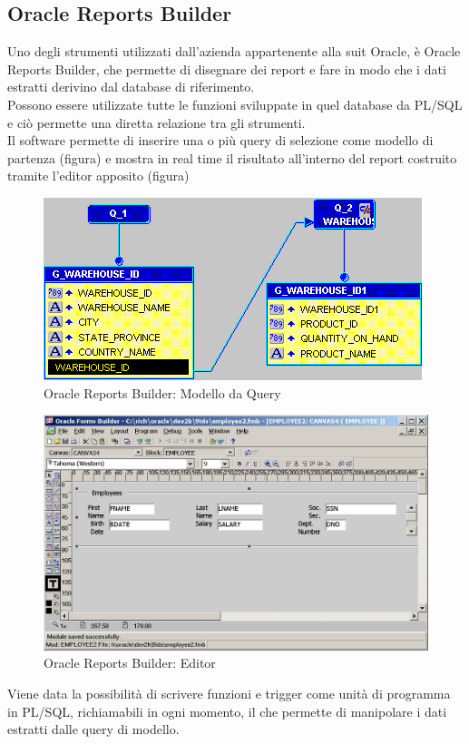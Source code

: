 \subsection{Oracle Reports Builder}
Uno degli strumenti utilizzati dall'azienda appartenente alla suit Oracle, è Oracle Reports Builder, che permette di disegnare dei report e fare in modo che i dati estratti derivino dal database di riferimento.\\
Possono essere utilizzate tutte le funzioni sviluppate in quel database da PL/SQL e ciò permette una diretta relazione tra gli strumenti.\\
Il software permette di inserire una o più query di selezione come modello di partenza (figura) e mostra in real time il risultato all'interno del report costruito tramite l'editor apposito (figura)
\newpage
\begin{figure}[!h]
\thispagestyle{empty}
\centering
\includegraphics[scale=0.83]{img/Modelbasic.png}
\caption{Oracle Reports Builder: Modello da Query}
\end{figure}\begin{figure}[!h]
\thispagestyle{empty}
\centering
\includegraphics[scale=0.50]{img/Editor.jpg}
\caption{Oracle Reports Builder: Editor}
\end{figure}
Viene data la possibilità di scrivere funzioni e trigger come unità di programma in PL/SQL, richiamabili in ogni momento, il che permette di manipolare i dati estratti dalle query di modello.

